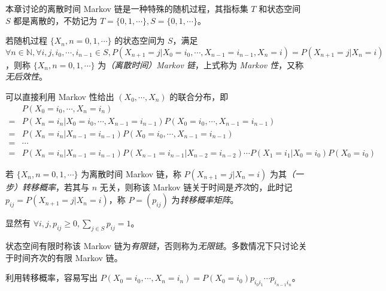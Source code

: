 \documentclass[../main.tex]{subfiles}
\begin{document}
本章讨论的离散时间 Markov 链是一种特殊的随机过程，其指标集 $T$ 和状态空间 $S$ 都是离散的，不妨记为 $T=\{0,1,\cdots\},S=\{0,1,\cdots\}$。

\begin{definition}\label{def:7.1.1}
    若随机过程 $\{X_n,n=0,1,\cdots\}$ 的状态空间为 $S$，满足 $\forall n\in\mathbb N,\forall i,j,i_0,\cdots,i_{n-1}\in S,P(X_{n+1}=j|X_0=i_0,\cdots,X_{n-1}=i_{n-1},X_n=i)=P(X_{n+1}=j|X_n=i)$，则称 $\{X_n,n=0,1,\cdots\}$ 为\emph{（离散时间）Markov 链}，上式称为 \emph{Markov 性}，又称\emph{无后效性}。
\end{definition}

可以直接利用 Markov 性给出 $(X_0,\cdots,X_n)$ 的联合分布，即
\begin{equation*}
    \begin{aligned}
          & P(X_0=i_0,\cdots,X_n=i_n)                                                                       \\
        = & P(X_n=i_n|X_0=i_0,\cdots,X_{n-1}=i_{n-1})P(X_0=i_0,\cdots,X_{n-1}=i_{n-1})                      \\
        = & P(X_n=i_n|X_{n-1}=i_{n-1})P(X_0=i_0,\cdots,X_{n-1}=i_{n-1})                                     \\
        = & \cdots                                                                                          \\
        = & P(X_n=i_n|X_{n-1}=i_{n-1})P(X_{n-1}=i_{n-1}|X_{n-2}=i_{n-2})\cdots P(X_1=i_1|X_0=i_0)P(X_0=i_0)
    \end{aligned}
\end{equation*}

\begin{definition}\label{def:7.1.2}
    若 $\{X_n,n=0,1,\cdots\}$ 为离散时间 Markov 链，称 $P(X_{n+1}=j|X_n=i)$ 为其\emph{（一步）转移概率}，若其与 $n$ 无关，则称该 Markov 链关于时间是\emph{齐次}的，此时记 $p_{ij}=P(X_{n+1}=j|X_n=i)$，称 $P=(p_{ij})$ 为\emph{转移概率矩阵}。
\end{definition}

显然有 $\forall i,j,p_{ij}\geq0,\sum_{j\in S}p_{ij}=1$。

状态空间有限时称该 Markov 链为\emph{有限链}，否则称为\emph{无限链}。多数情况下只讨论关于时间齐次的有限 Markov 链。

利用转移概率，容易写出 $P(X_0=i_0,\cdots,X_n=i_n)=P(X_0=i_0)p_{i_0i_1}\cdots p_{i_{n-1}i_n}$。
\end{document}
